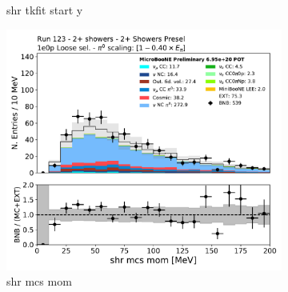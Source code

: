 \begin{figure}[H]
\begin{subfigure}{0.3\textwidth}
    \caption{shr tkfit start y}
    \end{subfigure}
    \begin{subfigure}{0.3\textwidth}
    \includegraphics[width=1.0\textwidth]{Sidebands/Figures/TwoShr_1e0pSel/loose/shrMCSMom.pdf}
    \caption{shr mcs mom}
    \end{subfigure}
    \caption{} 
    \label{fig:HE_1eNp_1}
\end{figure}

